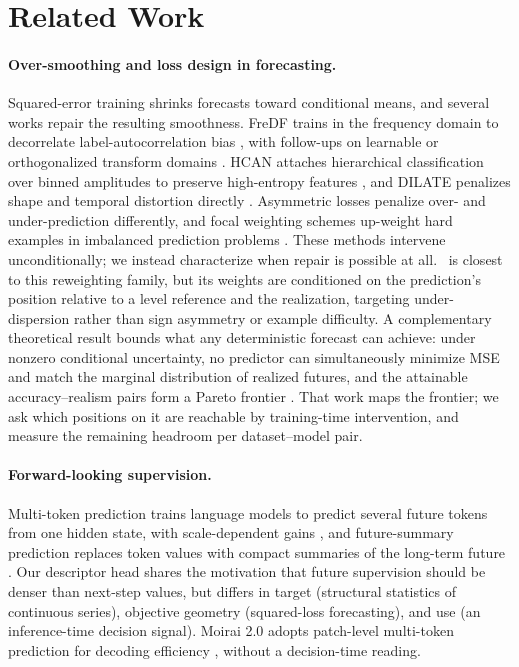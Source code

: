 \section{Related Work}

\paragraph{Over-smoothing and loss design in forecasting.}
Squared-error training shrinks forecasts toward conditional means, and several works repair the resulting smoothness. FreDF trains in the frequency domain to decorrelate label-autocorrelation bias \citep{fredf}, with follow-ups on learnable or orthogonalized transform domains \citep{transdf,olinear,fredn}. HCAN attaches hierarchical classification over binned amplitudes to preserve high-entropy features \citep{hcan}, and DILATE penalizes shape and temporal distortion directly \citep{dilate}. Asymmetric losses \citep{newey1987expectile,zellner1986linex} penalize over- and under-prediction differently, and focal weighting schemes up-weight hard examples in imbalanced prediction problems \citep{focal_loss,lds_fds}. These methods intervene unconditionally; we instead characterize when repair is possible at all. \rf~is closest to this reweighting family, but its weights are conditioned on the prediction's position relative to a level reference and the realization, targeting under-dispersion rather than sign asymmetry or example difficulty. A complementary theoretical result bounds what any deterministic forecast can achieve: under nonzero conditional uncertainty, no predictor can simultaneously minimize MSE and match the marginal distribution of realized futures, and the attainable accuracy--realism pairs form a Pareto frontier \citep{green2026expectations}. That work maps the frontier; we ask which positions on it are reachable by training-time intervention, and measure the remaining headroom per dataset--model pair.

\paragraph{Forward-looking supervision.}
Multi-token prediction trains language models to predict several future tokens from one hidden state, with scale-dependent gains \citep{gloeckle2024mtp,mutor}, and future-summary prediction replaces token values with compact summaries of the long-term future \citep{fsf}. Our descriptor head shares the motivation that future supervision should be denser than next-step values, but differs in target (structural statistics of continuous series), objective geometry (squared-loss forecasting), and use (an inference-time decision signal). Moirai 2.0 adopts patch-level multi-token prediction for decoding efficiency \citep{moirai2}, without a decision-time reading.

